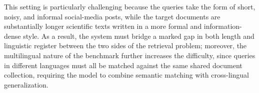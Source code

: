 This setting is particularly challenging because the queries take the form of short, noisy, and informal social-media
posts, while the target documents are substantially longer scientific texts written in a more formal and
information-dense style. As a result, the system must bridge a marked gap in both length and linguistic register between
the two sides of the retrieval problem; moreover, the multilingual nature of the benchmark further increases the
difficulty, since queries in different languages must all be matched against the same shared document collection,
requiring the model to combine semantic matching with cross-lingual generalization.
